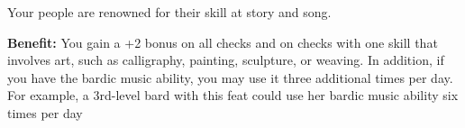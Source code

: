 
Your people are renowned for their skill at story and song.

\textbf{Benefit:} You gain a +2 bonus on all  checks and on checks with one  skill that involves art, such as calligraphy, painting, sculpture, or weaving. In addition, if you have the bardic music ability, you may use it three additional times per day. For example, a 3rd-level bard with this feat could use her bardic music ability six times per day